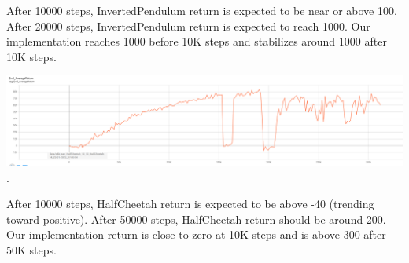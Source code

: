 \documentclass[11pt]{article}
\begin{document}
    After 10000 steps, InvertedPendulum return is expected to be near or above 100.
    After 20000 steps, InvertedPendulum return is expected to reach 1000.
    Our implementation reaches 1000 before 10K steps and stabilizes around 1000 after 10K steps.

    \includegraphics[scale=0.66]{q6/halfcheatah}.

    After 10000 steps, HalfCheetah return is expected to be above -40 (trending toward positive).
    After 50000 steps, HalfCheetah return should be around 200.
    Our implementation return is close to zero at 10K steps and is above 300 after 50K steps.
\end{document}
